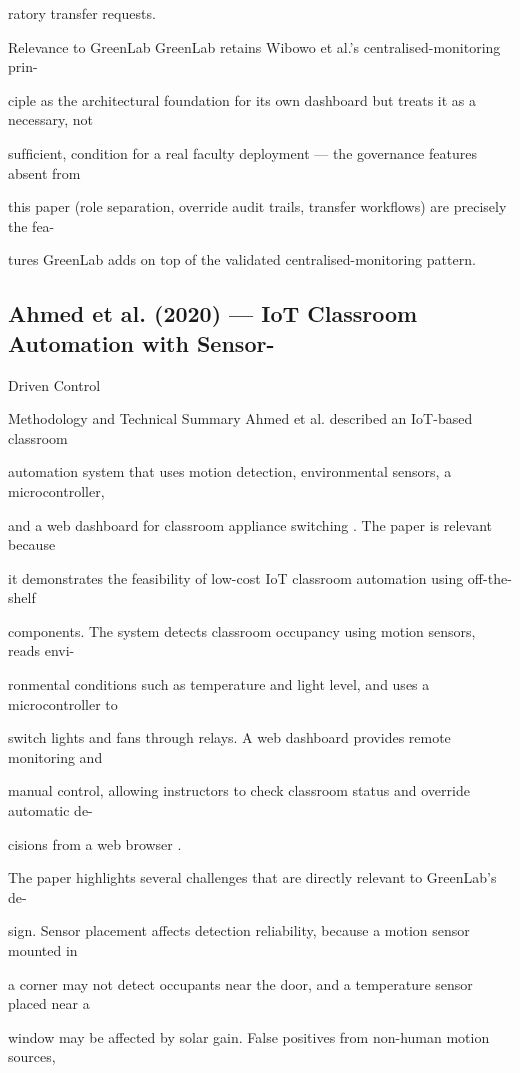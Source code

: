 ratory transfer requests.

Relevance to GreenLab GreenLab retains Wibowo et al.'s centralised-monitoring prin-

ciple as the architectural foundation for its own dashboard but treats it as a necessary, not

sufﬁcient, condition for a real faculty deployment --- the governance features absent from

this paper (role separation, override audit trails, transfer workﬂows) are precisely the fea-

tures GreenLab adds on top of the validated centralised-monitoring pattern.


\subsection{Ahmed et al. (2020) --- IoT Classroom Automation with Sensor-}
Driven Control

Methodology and Technical Summary Ahmed et al. described an IoT-based classroom

automation system that uses motion detection, environmental sensors, a microcontroller,

and a web dashboard for classroom appliance switching \cite{ahmed2020}. The paper is relevant because

it demonstrates the feasibility of low-cost IoT classroom automation using off-the-shelf

components. The system detects classroom occupancy using motion sensors, reads envi-

ronmental conditions such as temperature and light level, and uses a microcontroller to

switch lights and fans through relays. A web dashboard provides remote monitoring and

manual control, allowing instructors to check classroom status and override automatic de-

cisions from a web browser \cite{ahmed2020}.

The paper highlights several challenges that are directly relevant to GreenLab's de-

sign. Sensor placement affects detection reliability, because a motion sensor mounted in

a corner may not detect occupants near the door, and a temperature sensor placed near a

window may be affected by solar gain. False positives from non-human motion sources,

